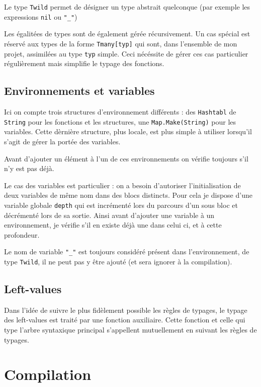 \documentclass[9pt,a4paper]{article}
\begin{document}
Le type \verb|Twild| permet de désigner un type abstrait quelconque (par exemple les expressions \verb|nil| ou \verb|"_"|)

Les égalitées de types sont de également gérée récursivement. Un cas spécial est réservé aux types de la forme \verb|Tmany[typ]| qui sont, dans l'ensemble de mon projet, assimilées au type \verb|typ| simple. Ceci nécéssite de gérer ces cas particulier régulièrement mais simplifie le typage des fonctions.

\subsection{Environnements et variables}

Ici on compte trois structures d'environnement différents : des \verb|Hashtabl| de \verb|String| pour les fonctions et les structures, une \verb|Map.Make(String)| pour les variables. Cette dèrnière structure, plus locale, est plus simple à utiliser lorsqu'il s'agit de gérer la portée des variables.

Avant d'ajouter un élément à l'un de ces environnements on vérifie toujours s'il n'y est pas déjà.

Le cas des variables est particulier : on a besoin d'autoriser l'initialisation de deux variables de même nom dans des blocs distincts. Pour cela je dispose d'une variable globale \verb|depth| qui est incrémenté lors du parcours d'un sous bloc et décrémenté lors de sa sortie. Ainsi avant d'ajouter une variable à un environnement, je vérifie s'il en existe déjà une dans celui ci, et à cette profondeur.

Le nom de variable \verb|"_"| est toujours considéré présent dans l'environnement, de type \verb|Twild|, il ne peut pas y être ajouté (et sera ignorer à la compilation).

\subsection{Left-values}

Dans l'idée de suivre le plus fidèlement possible les règles de typages, le typage des left-values est traité par une fonction auxiliaire. Cette fonction et celle qui type l'arbre syntaxique principal s'appellent mutuellement en suivant les règles de typages.

\section{Compilation}
\end{document}
